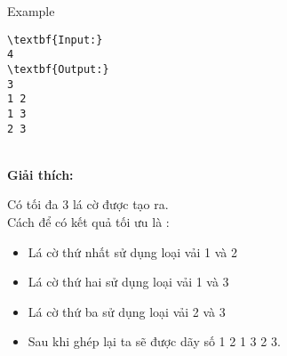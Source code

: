 Example
\begin{verbatim}
\textbf{Input:}
4
\textbf{Output:}
3
1 2
1 3
2 3\end{verbatim}


\\\textbf{Giải thích:}

Có tối đa 3 lá cờ được tạo ra.
\\Cách để có kết quả tối ưu là :
\begin{itemize}
	\item Lá cờ thứ nhất sử dụng loại vải 1 và 2
	\item Lá cờ thứ hai sử dụng loại vải 1 và 3
	\item Lá cờ thứ ba sử dụng loại vải 2 và 3
	\item Sau khi ghép lại ta sẽ được dãy số 1 2 1 3 2 3.
\end{itemize}